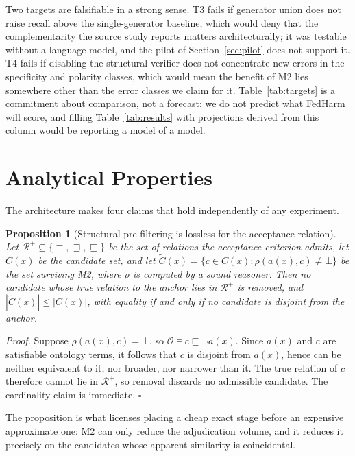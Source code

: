 \documentclass[conference]{IEEEtran}
\newcommand{\onto}{\mathcal{O}}
\newcommand{\rel}{\rho}
\newtheorem{proposition}{Proposition}
\begin{document}
Two targets are falsifiable in a strong sense. T3 fails if generator union does not raise recall above the single-generator baseline, which would deny that the complementarity the source study reports matters architecturally; it was testable without a language model, and the pilot of Section~\ref{sec:pilot} does not support it. T4 fails if disabling the structural verifier does not concentrate new errors in the specificity and polarity classes, which would mean the benefit of M2 lies somewhere other than the error classes we claim for it. Table~\ref{tab:targets} is a commitment about comparison, not a forecast: we do not predict what FedHarm will score, and filling Table~\ref{tab:results} with projections derived from this column would be reporting a model of a model.

\section{Analytical Properties}
\label{sec:analysis}

The architecture makes four claims that hold independently of any experiment.

\begin{proposition}[Structural pre-filtering is lossless for the acceptance relation]
\label{prop:prefilter}
Let $\mathcal{R}^{+} \subseteq \{\equiv, \sqsupseteq, \sqsubseteq\}$ be the set of relations the acceptance criterion admits, let $C(x)$ be the candidate set, and let $\tilde{C}(x) = \{c \in C(x) : \rel(a(x),c) \neq \bot\}$ be the set surviving M2, where $\rel$ is computed by a sound reasoner. Then no candidate whose true relation to the anchor lies in $\mathcal{R}^{+}$ is removed, and $|\tilde{C}(x)| \le |C(x)|$, with equality if and only if no candidate is disjoint from the anchor.
\end{proposition}

\noindent\textit{Proof.} Suppose $\rel(a(x),c) = \bot$, so $\onto \models c \sqsubseteq \neg a(x)$. Since $a(x)$ and $c$ are satisfiable ontology terms, it follows that $c$ is disjoint from $a(x)$, hence can be neither equivalent to it, nor broader, nor narrower than it. The true relation of $c$ therefore cannot lie in $\mathcal{R}^{+}$, so removal discards no admissible candidate. The cardinality claim is immediate. \hfill$\square$

The proposition is what licenses placing a cheap exact stage before an expensive approximate one: M2 can only reduce the adjudication volume, and it reduces it precisely on the candidates whose apparent similarity is coincidental.
\end{document}

